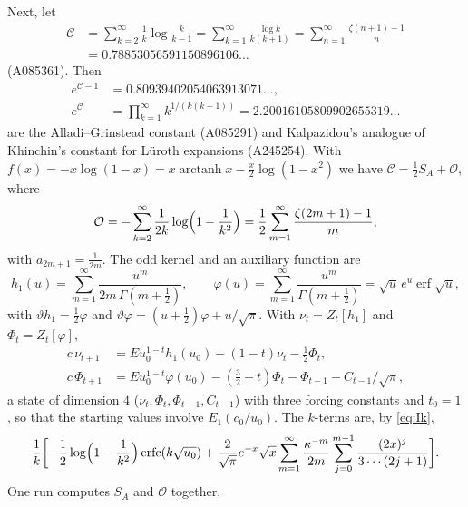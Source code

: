 \documentclass[11pt,reqno]{amsart}
\theoremstyle{definition}
\theoremstyle{remark}
\newcommand{\erfc}{\operatorname{erfc}}
\newcommand{\erf}{\operatorname{erf}}
\newcommand{\arctanh}{\operatorname{arctanh}}
\begin{document}
Next, let
\begin{align*}
  \mathcal C &= \sum_{k=2}^{\infty}\frac1k\log\frac{k}{k-1} = \sum_{k=1}^{\infty}\frac{\log k}{k(k+1)} = \sum_{n=1}^{\infty}\frac{\zeta(n+1)-1}{n} \\
  &= 0.78853056591150896106\ldots
\end{align*}
(A085361). Then
\begin{align*}
  e^{\mathcal C-1} &= 0.80939402054063913071\ldots, \\
  e^{\mathcal C} &= \prod_{k=1}^{\infty}k^{1/(k(k+1))} = 2.20016105809902655319\ldots
\end{align*}
are the Alladi--Grinstead constant \cite{AG77} (A085291) and Kalpazidou's analogue of Khinchin's constant for
L\"uroth expansions \cite{Kal88} (A245254). With
$f(x) = -x\log(1-x) = x\arctanh x - \frac x2\log(1-x^2)$ we have $\mathcal C = \frac12S_A + \mathcal O$, where
\[
  \mathcal O = -\sum_{k=2}^{\infty}\frac{1}{2k}\log\Bigl(1-\frac1{k^2}\Bigr) = \frac12\sum_{m=1}^{\infty}\frac{\zeta(2m+1)-1}{m},
\]
with $a_{2m+1} = \frac1{2m}$. The odd kernel and an auxiliary function are
\[
  h_1(u) = \sum_{m=1}^{\infty}\frac{u^m}{2m\,\Gamma(m+\frac12)}, \qquad
  \varphi(u) = \sum_{m=1}^{\infty}\frac{u^m}{\Gamma(m+\frac12)} = \sqrt u\,e^u\erf\sqrt u,
\]
with $\vartheta h_1 = \frac12\varphi$ and $\vartheta\varphi = (u+\frac12)\varphi + u/\sqrt\pi$. With $\nu_t = Z_t[h_1]$ and
$\Phi_t = Z_t[\varphi]$,
\begin{align*}
  c\,\nu_{t+1} &= Eu_0^{1-t}h_1(u_0) - (1-t)\nu_t - \tfrac12\Phi_t, \\
  c\,\Phi_{t+1} &= Eu_0^{1-t}\varphi(u_0) - (\tfrac32-t)\Phi_t - \Phi_{t-1} - C_{t-1}/\sqrt\pi,
\end{align*}
a state of dimension $4$ ($\nu_t, \Phi_t, \Phi_{t-1}, C_{t-1}$) with three forcing constants and $t_0 = 1$, so that the
starting values involve $E_1(c_0/u_0)$. The $k$-terms are, by \eqref{eq:Ik},
\[
  \frac1k\biggl[-\frac12\log\Bigl(1-\frac1{k^2}\Bigr)\erfc(k\sqrt{u_0})
  + \frac{2}{\sqrt\pi}e^{-x}\sqrt x\sum_{m=1}^{\infty} \frac{\kappa^{-m}}{2m}\sum_{j=0}^{m-1}\frac{(2x)^j}{3\cdots(2j+1)}\biggr].
\]
One run computes $S_A$ and $\mathcal O$ together.
\end{document}
